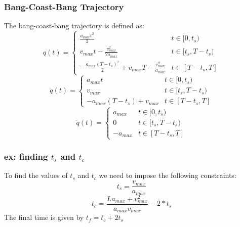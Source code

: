 \documentclass[a4paper,12pt]{article}
\begin{document}
\subsubsection{Bang-Coast-Bang Trajectory}
The bang-coast-bang trajectory is defined as:
\begin{equation}
        q(t) = \begin{cases}
            \frac{a_{max}t^2}{2} & t \in [0,t_s)\\
            v_{max}t - \frac{v^2_{max}}{2a_{max}} & t \in [t_s,T-t_s)\\
            -\frac{a_{max}(T-t_s)^2}{2}+v_{max}T -\frac{v^2_{max}}{a_{max}} & t \in [T-t_s,T]
        \end{cases}
    \end{equation}
    \begin{equation}
        \dot{q}(t) = \begin{cases}
            a_{max}t & t \in [0,t_s)\\
            v_{max} & t \in [t_s,T-t_s)\\
            -a_{max}(T-t_s)+v_{max} & t \in [T-t_s,T]
        \end{cases}
    \end{equation}
    \begin{equation}
        \ddot{q}(t) = \begin{cases}
            a_{max} & t \in [0,t_s)\\
            0 & t \in [t_s,T-t_s)\\
            -a_{max} & t \in [T-t_s,T]
        \end{cases}
\end{equation}
\subsubsection{ex: finding $t_s$ and $t_c$}
To find the values of $t_s$ and $t_c$ we need to impose the following constraints:
\begin{equation}
t_s = \frac{v_{max}}{a_{max}} 
\end{equation}
\begin{equation}
    t_c = \frac{La_{max} + v^2_{max}}{a_{max}v_{max}} - 2*t_s
    \end{equation}
 The final time is given by $t_f = t_c + 2t_s$
\end{document}
